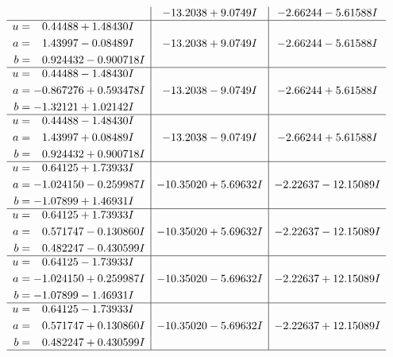 \documentclass[1p]{elsarticle_modified}
\theoremstyle{definition}
\begin{document}
$$\begin{array}{c|c|c}
 & -13.2038 + 9.0749 I & -2.66244 - 5.61588 I \\ \hline\begin{aligned}
u &= \phantom{-}0.44488 + 1.48430 I \\
a &= \phantom{-}1.43997 - 0.08489 I \\
b &= \phantom{-}0.924432 - 0.900718 I\end{aligned}
 & -13.2038 + 9.0749 I & -2.66244 - 5.61588 I \\ \hline\begin{aligned}
u &= \phantom{-}0.44488 - 1.48430 I \\
a &= -0.867276 + 0.593478 I \\
b &= -1.32121 + 1.02142 I\end{aligned}
 & -13.2038 - 9.0749 I & -2.66244 + 5.61588 I \\ \hline\begin{aligned}
u &= \phantom{-}0.44488 - 1.48430 I \\
a &= \phantom{-}1.43997 + 0.08489 I \\
b &= \phantom{-}0.924432 + 0.900718 I\end{aligned}
 & -13.2038 - 9.0749 I & -2.66244 + 5.61588 I \\ \hline\begin{aligned}
u &= \phantom{-}0.64125 + 1.73933 I \\
a &= -1.024150 - 0.259987 I \\
b &= -1.07899 + 1.46931 I\end{aligned}
 & -10.35020 + 5.69632 I & -2.22637 - 12.15089 I \\ \hline\begin{aligned}
u &= \phantom{-}0.64125 + 1.73933 I \\
a &= \phantom{-}0.571747 - 0.130860 I \\
b &= \phantom{-}0.482247 - 0.430599 I\end{aligned}
 & -10.35020 + 5.69632 I & -2.22637 - 12.15089 I \\ \hline\begin{aligned}
u &= \phantom{-}0.64125 - 1.73933 I \\
a &= -1.024150 + 0.259987 I \\
b &= -1.07899 - 1.46931 I\end{aligned}
 & -10.35020 - 5.69632 I & -2.22637 + 12.15089 I \\ \hline\begin{aligned}
u &= \phantom{-}0.64125 - 1.73933 I \\
a &= \phantom{-}0.571747 + 0.130860 I \\
b &= \phantom{-}0.482247 + 0.430599 I\end{aligned}
 & -10.35020 - 5.69632 I & -2.22637 + 12.15089 I\\
 \hline 
 \end{array}$$\newpage\newpage\renewcommand{\arraystretch}{1}
\end{document}
